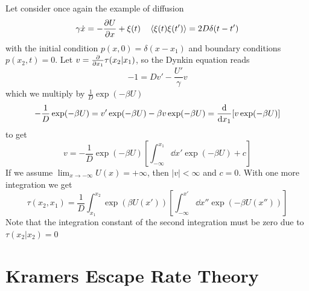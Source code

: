 \documentclass{notebook}
\begin{document}
Let consider once again the example of diffusion
%
\begin{equation}
\gamma \dot{x} = - \pdv{U}{x} + \xi(t) \quad \expval{\xi(t)\xi(t')} = 2D \delta(t-t')
\end{equation}
%
with the initial condition $p(x,0) = \delta(x-x_1)$ and boundary conditions $p(x_2,t) = 0$. Let $v = \pdv{x_1} \tau(x_2 | x_1)$, so the Dynkin equation reads
%
\begin{equation}
-1 = D v' - \frac{U'}{\gamma}v
\end{equation}
%
which we multiply by $\frac{1}{D}\exp(-\beta U)$
%
\begin{equation}
-\frac{1}{D}\exp(-\beta U) = v'\exp(-\beta U) - \beta v \exp(-\beta U) = \dv{x_1}[v \exp(-\beta U)]
\end{equation}
%
to get
%
\begin{equation}
v = -\frac{1}{D}\exp(-\beta U) \left[ \int_{-\infty}^{x_1} \dd{x'} \exp(-\beta U) + c \right]
\end{equation}
%
If we assume $\lim_{x\to -\infty} U(x) = +\infty$, then $|v| < \infty$ and $c = 0$. With one more integration we get
%
\begin{equation}
\tau(x_2,x_1) = \frac{1}{D} \int_{x_1}^{x_2} \exp(\beta U(x')) \left[ \int_{-\infty}^{x'} \dd{x''} \exp(-\beta U(x'')) \right]
\end{equation}
%
Note that the integration constant of the second integration must be zero due to $\tau(x_2 | x_2) = 0$

\section{Kramers Escape Rate Theory}
\label{sec:kramerstheory}
\end{document}

